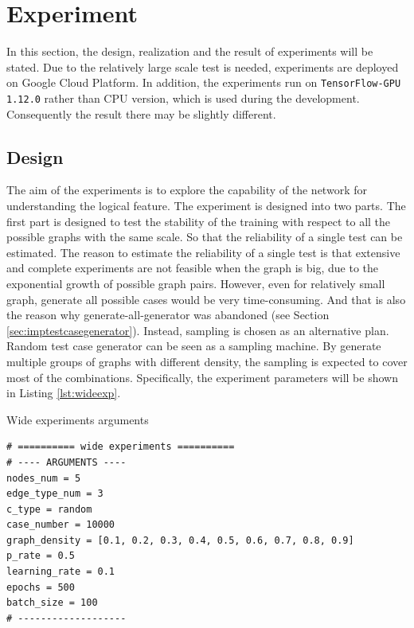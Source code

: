 \section{Experiment}
\label{sec:experiment}
In this section, the design, realization and the result of experiments will be stated.
Due to the relatively large scale test is needed, experiments are deployed on Google Cloud Platform. 
In addition, the experiments run on \texttt{TensorFlow-GPU 1.12.0} rather than CPU version, which is used during the development.
Consequently the result there may be slightly different.

\subsection{Design}
The aim of the experiments is to explore the capability of the network for understanding the logical feature.
The experiment is designed into two parts.
The first part is designed to test the stability of the training with respect to all the possible graphs with the same scale.
So that the reliability of a single test can be estimated.
The reason to estimate the reliability of a single test is that extensive and complete experiments are not feasible when the graph is big, due to the exponential growth of possible graph pairs.
However, even for relatively small graph, generate all possible cases would be very time-consuming. 
And that is also the reason why generate-all-generator was abandoned (see Section \ref{sec:imptestcasegenerator}).
Instead, sampling is chosen as an alternative plan.
Random test case generator can be seen as a sampling machine.
By generate multiple groups of graphs with different density, the sampling is expected to cover most of the combinations.
Specifically, the experiment parameters will be shown in Listing \ref{lst:wideexp}.


\begin{code}
\caption{Wide experiments arguments}
\label{lst:wideexp}
\begin{verbatim}
# ========== wide experiments ==========
# ---- ARGUMENTS ----
nodes_num = 5 
edge_type_num = 3 
c_type = random 
case_number = 10000 
graph_density = [0.1, 0.2, 0.3, 0.4, 0.5, 0.6, 0.7, 0.8, 0.9]
p_rate = 0.5 
learning_rate = 0.1
epochs = 500
batch_size = 100
# -------------------

\end{verbatim}
\end{code}

